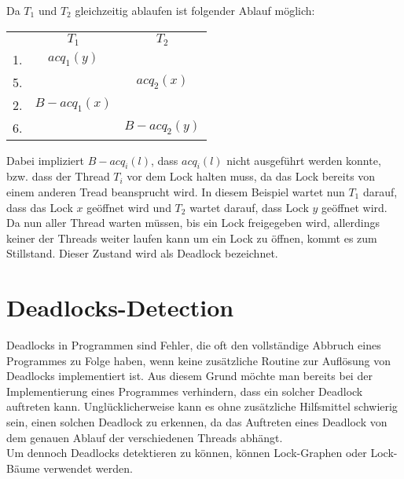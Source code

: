 Da $T_1$ und $T_2$ gleichzeitig ablaufen ist folgender Ablauf möglich:
\begin{table}[H]
    \centering
    \begin{tabular}{ccc}
       & $T_1$          & $T_2$          \\
    1. & $acq_{1}(y)$ &                \\
    5. &                & $acq_{2}(x)$ \\
    2. & $B-acq_{1}(x)$ &                \\
    6. &                & $B-acq_{2}(y)$
    \end{tabular}
\end{table}
Dabei impliziert $B-acq_i(l)$, dass $acq_{i}(l)$ nicht ausgeführt werden konnte, bzw. dass der Thread $T_i$ vor dem Lock halten muss, da das Lock bereits von einem anderen Tread beansprucht wird. In diesem Beispiel wartet nun $T_1$ darauf, dass das Lock $x$ geöffnet wird und $T_2$ wartet darauf, dass Lock $y$ geöffnet wird. Da nun aller Thread warten müssen, bis ein Lock freigegeben wird, allerdings keiner der Threads weiter laufen kann um ein Lock zu öffnen, kommt es zum Stillstand. Dieser Zustand wird als Deadlock bezeichnet.
\section{Deadlocks-Detection}
Deadlocks in Programmen sind Fehler, die oft den vollständige Abbruch eines Programmes zu Folge haben, wenn keine zusätzliche Routine zur Auflösung von Deadlocks implementiert ist. Aus diesem Grund möchte man bereits bei der Implementierung eines Programmes verhindern, dass ein solcher Deadlock auftreten kann. Unglücklicherweise kann es ohne zusätzliche Hilfsmittel schwierig sein, einen solchen Deadlock zu erkennen, da das Auftreten eines Deadlock von dem genauen Ablauf der verschiedenen Threads abhängt.\\ Um dennoch Deadlocks detektieren zu können, können Lock-Graphen oder Lock-Bäume verwendet werden.
